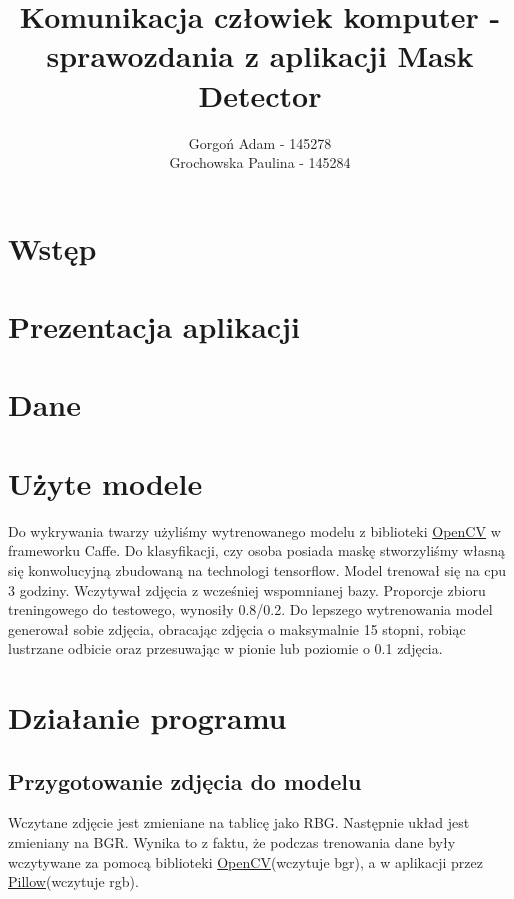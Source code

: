 \documentclass[12pt]{article}
\title{Komunikacja człowiek komputer - sprawozdania z aplikacji Mask Detector}
\author{Gorgoń Adam - 145278\\Grochowska Paulina - 145284}
\begin{document}
	\maketitle
	
	\section{Wstęp}
	\section{Prezentacja aplikacji}
	\section{Dane}
	\section{Użyte modele}
	Do wykrywania twarzy użyliśmy wytrenowanego modelu z biblioteki \href{https://opencv.org/}{OpenCV} w frameworku Caffe\cite{jia_caffe_2014}. Do klasyfikacji, czy osoba posiada maskę stworzyliśmy własną się konwolucyjną zbudowaną na technologi tensorflow\cite{tensorflow2015-whitepaper}. Model trenował się na cpu 3 godziny. Wczytywał zdjęcia z wcześniej wspomnianej bazy. Proporcje zbioru treningowego do testowego, wynosiły 0.8/0.2. Do lepszego wytrenowania model generował sobie zdjęcia, obracając zdjęcia o maksymalnie 15 stopni, robiąc lustrzane odbicie oraz przesuwając w pionie lub poziomie o 0.1 zdjęcia.
	\section{Działanie programu}
		\subsection{Przygotowanie zdjęcia do modelu}
		Wczytane zdjęcie jest zmieniane na tablicę jako RBG. Następnie układ jest zmieniany na BGR. Wynika to z faktu, że podczas trenowania dane były wczytywane za pomocą biblioteki \href{https://opencv.org/}{OpenCV}(wczytuje bgr), a w aplikacji przez \href{https://pillow.readthedocs.io/en/stable/}{Pillow}(wczytuje rgb).
		
\end{document}

